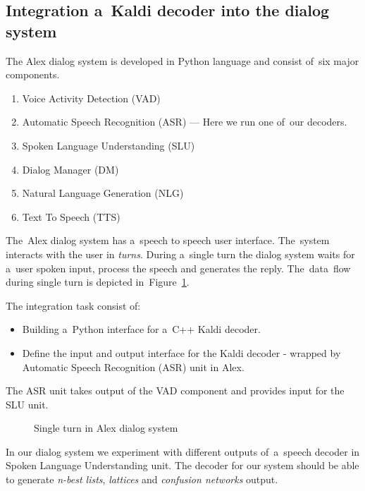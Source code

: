 \subsection{Integration a~Kaldi decoder into the dialog system} 
\label{sub:integration}
The Alex dialog system is developed in Python language and consist of~six major components. 
\begin{enumerate}
    \item Voice Activity Detection (VAD)
    \item Automatic Speech Recognition (ASR) --- Here we run one of~our decoders.
    \item Spoken Language Understanding (SLU)
    \item Dialog Manager (DM)
    \item Natural Language Generation (NLG)
    \item Text To Speech (TTS)
\end{enumerate}
The~Alex dialog system has a~speech to speech user interface. The~system interacts with the user in {\it turns}. During a~single turn the dialog system waits for a~user spoken input, process the speech and generates the reply.
The~data~flow during single turn is depicted in~Figure~\ref{fig:dialog_system}.

The integration task consist of:
\begin{itemize}
    \item Building a~Python interface for a~C++ Kaldi decoder.
    \item Define the input and output interface for the Kaldi decoder - wrapped by Automatic Speech Recognition (ASR) unit in Alex.
\end{itemize}
 The ASR unit takes output of the VAD component and provides input for the SLU unit. 

\begin{figure}
    \begin{center}
    
    \caption{Single turn in Alex dialog system}
    \label{fig:dialog_system} 
    \end{center}
\end{figure}

In our dialog system we experiment with different outputs of~a~speech decoder in Spoken Language Understanding unit. 
The decoder for our system should be able to generate {\it n-best lists}, {\it lattices} and {\it confusion networks} output.


